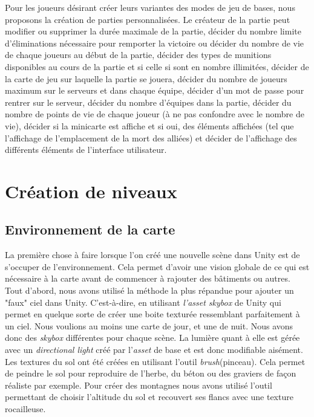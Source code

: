 \documentclass[12pt, titlepage]{article}
\begin{document}
\begin{spacing}{1.5}
Pour les joueurs désirant créer leurs variantes des modes de jeu de bases, nous proposons la création de parties personnalisées. Le créateur de la partie peut modifier ou supprimer la durée maximale de la partie, décider du nombre limite d'éliminations nécessaire pour remporter la victoire ou décider du nombre de vie de chaque joueurs au début de la partie, décider des types de munitions disponibles au cours de la partie et si celle si sont en nombre illimitées, décider de la carte de jeu sur laquelle la partie se jouera, décider du nombre de joueurs maximum sur le serveurs et dans chaque équipe, décider d'un mot de passe pour rentrer sur le serveur, décider du nombre d'équipes dans la partie, décider du nombre de points de vie de chaque joueur (à ne pas confondre avec le nombre de vie), décider si la minicarte est affiche et si oui, des éléments affichées (tel que l'affichage de l'emplacement de la mort des alliées) et décider de l'affichage des différents éléments  de l'interface utilisateur. \\

\newpage
\section{Création de niveaux}

\subsection{Environnement de la carte}
La première chose à faire lorsque l’on créé une nouvelle scène dans Unity est de s’occuper de l’environnement. Cela permet d’avoir une vision globale de ce qui est nécessaire à la carte avant de commencer à rajouter des bâtiments ou autres.\\

Tout d’abord, nous avons utilisé la méthode la plus répandue pour ajouter un "faux" ciel dans Unity. C’est-à-dire, en utilisant \textit{l'asset skybox} de Unity qui permet en quelque sorte de créer une boite texturée ressemblant parfaitement à un ciel. Nous voulions au moins une carte de jour, et une de nuit. Nous avons donc des \textit{skybox} différentes pour chaque scène. La lumière quant à elle est gérée avec un \textit{directional light} créé par l'\textit{asset} de base et est donc modifiable aisément.\\

Les textures du sol ont été créées en utilisant l'outil \textit{brush}(pinceau). Cela permet de peindre le sol pour reproduire de l’herbe, du béton ou des graviers de façon réaliste par exemple. Pour créer des montagnes nous avons utilisé l’outil permettant de choisir l’altitude du sol et recouvert ses flancs avec une texture rocailleuse.\\


\end{spacing}
\end{document}
